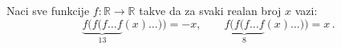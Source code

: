 \problem
Naci sve funkcije $f \colon \mathbb{R} \to \mathbb{R}$ takve da za svaki realan broj $x$ vazi:
\[
    \underbrace{f(f(f \ldots f}_{13}(x)\ldots)) = -x
,\qquad
    \underbrace{f(f(f\ldots f}_{8}(x)\ldots)) = x
\,.\]
\solution
\endproblem

